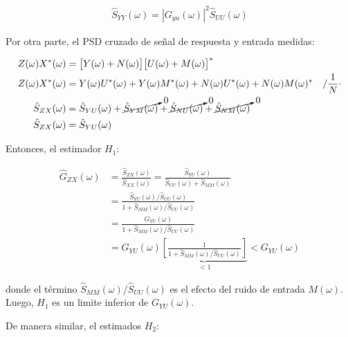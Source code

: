 \begin{align*}
    \hat{S}_{YY}(\omega) = |G_{yu}(\omega)|^2 \hat{S}_{UU}(\omega) 
\end{align*}

Por otra parte, el PSD cruzado de señal de respuesta y entrada medidas:

\begin{align*}
    Z(\omega)X^{*}(\omega) &= \bigl[ Y(\omega)+N(\omega) \bigr] \bigl[ U(\omega)+M(\omega)\bigr]^{*}\\
    Z(\omega)X^{*}(\omega) &= Y(\omega)U^{*}(\omega)+Y(\omega)M^{*}(\omega)+N(\omega)U^{*}(\omega)+N(\omega)M(\omega)^{*} \quad / \frac{1}{N}\cdot \\
    \hat{S}_{ZX}(\omega) &= \hat{S}_{YU}(\omega) + \cancelto{0}{\hat{S}_{YM}(\omega)} + \cancelto{0}{\hat{S}_{NU}(\omega)} + \cancelto{0}{\hat{S}_{NM}(\omega)}\\
    \hat{S}_{ZX}(\omega) &= \hat{S}_{YU}(\omega)
\end{align*}

Entonces, el estimador $H_1$: 


\begin{align*}
    \hat{G}_{ZX}(\omega) &= \frac{\hat{S}_{ZX}(\omega)}{\hat{S}_{XX}(\omega)}=\frac{\hat{S}_{YU}(\omega)}{\hat{S}_{UU}(\omega)+\hat{S}_{MM}(\omega)}\\
    &= \frac{\hat{S}_{YU}(\omega)/\hat{S}_{UU}(\omega)}{1+\hat{S}_{MM}(\omega)/\hat{S}_{UU}(\omega)}\\
    &= \frac{G_{YU}(\omega)}{1+\hat{S}_{MM}(\omega)/\hat{S}_{UU}(\omega)} \\
    &= G_{YU}(\omega) \underbrace{\left[ \frac{1}{1+\hat{S}_{MM}(\omega)/\hat{S}_{UU}(\omega)} \right]}_{< 1} < G_{YU}(\omega)
\end{align*}

donde el término $\hat{S}_{MM}(\omega)/\hat{S}_{UU}(\omega)$ es el efecto del ruido de entrada $M(\omega)$. Luego, $H_1$ es un limite inferior de $G_{YU}(\omega)$.\\

\par De manera similar, el estimados $H_2$:


